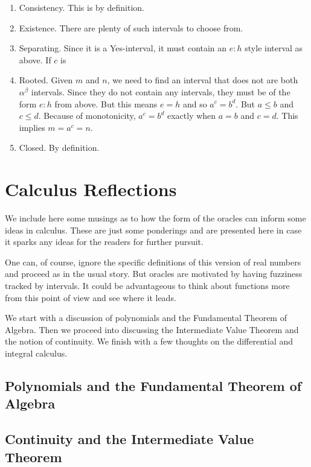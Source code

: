 \documentclass[12pt]{article}
\theoremstyle{remark}
\begin{document}
\begin{enumerate}
    \item Consistency. This is by definition. 
    \item Existence. There are plenty of such intervals to choose from.
    \item Separating. Since it is a Yes-interval, it must contain an $e:h$ style interval as above. If $c$ is 
    \item Rooted. Given $m$ and $n$, we need to find an interval that does not  are both $\alpha^\beta$ intervals. Since they do not contain any intervals, they must be of the form $e:h$ from above. But this means $e=h$ and so $a^c = b^d$. But $a \leq b$ and $c \leq d$. Because of monotonicity, $a^c = b^d$ exactly when $a=b$ and $c=d$. This implies $m = a^c = n$.
    \item Closed. By definition. 
\end{enumerate}




\section{Calculus Reflections}\label{app:calc}

We include here some musings as to how the form of the oracles can inform some ideas in calculus. These are just some ponderings and are presented here in case it sparks any ideas for the readers for further pursuit. 

One can, of course, ignore the specific definitions of this version of real numbers and proceed as in the usual story. But oracles are motivated by having fuzziness tracked by intervals. It could be advantageous to think about functions more from this point of view and see where it leads. 

We start with a discussion of polynomials and the Fundamental Theorem of Algebra. Then we proceed into discussing the Intermediate Value Theorem and the notion of continuity. We finish with a few thoughts on the differential and integral calculus. 

\subsection{Polynomials and the Fundamental Theorem of Algebra}

\subsection{Continuity and the Intermediate Value Theorem}
\end{document}
